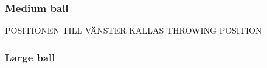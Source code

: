 \subsubsection{Medium ball}\label{sec:medium_ball_delivery}
POSITIONEN TILL VÄNSTER KALLAS THROWING POSITION \\

\subsubsection{Large ball}\label{sec:large_ball_delivery}


